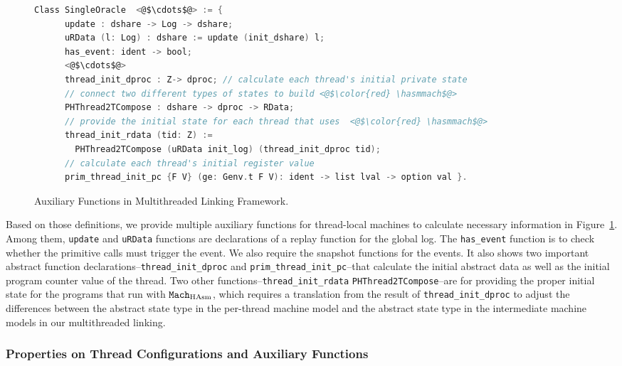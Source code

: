 \begin{figure}
\begin{lstlisting}[language=C, morekeywords={Class}]
  Class SingleOracle  <@$\cdots$@> := {
      update : dshare -> Log -> dshare;
      uRData (l: Log) : dshare := update (init_dshare) l;
      has_event: ident -> bool;      
      <@$\cdots$@>
      thread_init_dproc : Z-> dproc; // calculate each thread's initial private state
      // connect two different types of states to build <@$\color{red} \hasmmach$@>
      PHThread2TCompose : dshare -> dproc -> RData; 
      // provide the initial state for each thread that uses  <@$\color{red} \hasmmach$@>
      thread_init_rdata (tid: Z) :=
        PHThread2TCompose (uRData init_log) (thread_init_dproc tid);
      // calculate each thread's initial register value
      prim_thread_init_pc {F V} (ge: Genv.t F V): ident -> list lval -> option val }.
\end{lstlisting}
\caption{Auxiliary Functions in Multithreaded Linking Framework.}
\label{fig:chapter:conlink:multithreaded-linking-aux-functions}
\end{figure}

Based on those definitions, we provide multiple auxiliary functions 
for thread-local machines to calculate necessary information in Figure~\ref{fig:chapter:conlink:multithreaded-linking-aux-functions}.
Among them,  \lstinline$update$ and \lstinline$uRData$ functions are  declarations of a replay function for the global log. 
The \lstinline$has_event$ function is to check whether the primitive calls must trigger the event.
We also require the snapshot functions for the events.
It also shows two important abstract function declarations--\lstinline$thread_init_dproc$ and \lstinline$prim_thread_init_pc$--that calculate the initial abstract data as well as the initial program counter value of the thread. 
Two other functions--\lstinline$thread_init_rdata$ \lstinline$PHThread2TCompose$--are for providing the proper initial state for the programs that run with ${\mathrm{\texttt{Mach}}}_{\mathrm{HAsm}}$, 
which requires a translation from the result of \lstinline$thread_init_dproc$   to adjust the differences between
the abstract state type in the per-thread machine model and the abstract state type in the
intermediate machine models in our multithreaded linking. 

\subsubsection{Properties on Thread Configurations and Auxiliary Functions}


